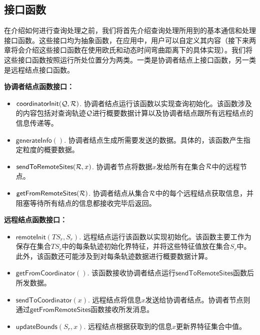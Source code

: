 
\subsection{接口函数}\label{sec-c3-interface}
在介绍如何进行查询处理之前，我们将首先介绍查询处理所用到的基本通信和处理接口函数。这些接口均为抽象函数，在应用中，用户可以自定义其内容（接下来两章将会介绍这些接口函数在使用欧氏和动态时间弯曲距离下的具体实现）。我们将这些接口函数按照运行所处位置分为两类。一类是协调者结点上接口函数，另一类是远程结点接口函数。

\textbf{协调者结点函数接口：}
\begin{itemize}
	\item  $\textsf{coordinatorInit}({\cal Q}, {\cal R})$.
	协调者结点运行该函数以实现查询初始化。该函数涉及的内容包括对查询轨迹$\cal Q$进行概要数据计算以及协调者结点跟所有远程结点的信息传递等。
	\item $\textsf{generateInfo}()$. 
	协调者结点生成所需要发送的数据。具体的，该函数产生指定粒度的概要数据。
	\item  $\textsf{sendToRemoteSites}({\cal R}, x)$.
	协调者节点将数据$x$发给所有在集合$\cal R$中的远程节点。
	
	\item $\textsf{getFromRemoteSites}({\cal R})$.
	协调者结点从集合$\cal R$中的每个远程结点获取信息，并阻塞等待所有结点的信息都接收完毕后返回。
\end{itemize}	

\textbf{远程结点函数接口：}
\begin{itemize}
	\item $\textsf{remoteInit}(TS_{r} , S_{r})$.
	远程结点运行该函数以实现初始化。该函数主要工作为保存在集合$TS_{r}$中的每条轨迹初始化界特征，并将这些特征值放在集合$S_{r}$中。此外，该函数还可能涉及到对每条轨迹数据进行概要数据计算。
	
	\item $\textsf{getFromCoordinator}()$. 
	该函数接收协调者结点运行$\textsf{sendToRemoteSites}$函数后所发数据。
	
	\item $\textsf{sendToCoordinator}(x)$.
	远程结点将信息$x$发送给协调者结点。协调者节点则通过$\textsf{getFromRemoteSites}$函数接收所发消息。
	
	\item $\textsf{updateBounds}(S_r, x)$.
	远程结点根据获取到的信息$x$更新界特征集合中值。
\end{itemize}	



